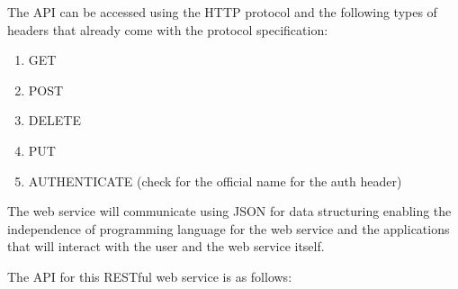 The API can be accessed using the HTTP protocol and the following types of
headers that already come with the protocol specification:
\begin{enumerate}
	\item GET
	\item POST
	\item DELETE
	\item PUT
	\item AUTHENTICATE (check for the official name for the auth header)
\end{enumerate}

The web service will communicate using JSON for data structuring enabling the
independence of programming language for the web service and the applications
that will interact with the user and the web service itself.

The API for this RESTful web service is as follows:
